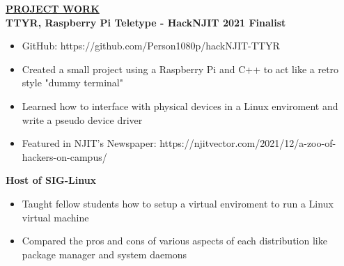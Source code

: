 \documentclass{article}
\begin{document}
%
%
\noindent \textbf{\underline{PROJECT WORK}} \\
\noindent \textbf{TTYR, Raspberry Pi Teletype - HackNJIT 2021 Finalist} 
\begin{itemize}[noitemsep,nolistsep,leftmargin=*]
\item {GitHub: https://github.com/Person1080p/hackNJIT-TTYR}
\item {Created a small project using a Raspberry Pi and C++ to act like a retro style "dummy terminal"}
\item {Learned how to interface with physical devices in a Linux enviroment and write a pseudo device driver}
\item {Featured in NJIT's Newspaper: https://njitvector.com/2021/12/a-zoo-of-hackers-on-campus/}
\end{itemize}
\noindent \textbf{Host of SIG-Linux} 
\begin{itemize}[noitemsep,nolistsep,leftmargin=*]
\item {Taught fellow students how to setup a virtual enviroment to run a Linux virtual machine}
\item {Compared the pros and cons of various aspects of each distribution like package manager and system daemons}
\\
\end{itemize}
\end{document}
